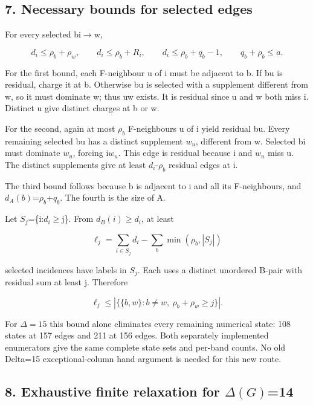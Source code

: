 \documentclass[
  11pt,
]{article}
\begin{document}
\hypertarget{necessary-bounds-for-selected-edges}{%
\subsection{7. Necessary bounds for selected
edges}\label{necessary-bounds-for-selected-edges}}

For every selected bi\ensuremath{\to}w,

\[
d_i\le \rho _b+\rho _w,\qquad d_i\le \rho _b+R_i,
\qquad d_i\le \rho _b+q_b-1,\qquad q_b+\rho _b\le a. \tag{7.1}
\]

For the first bound, each F-neighbour u of i must be adjacent to b. If
bu is residual, charge it at b. Otherwise bu is selected with a
supplement different from w, so it must dominate w; thus uw exists. It
is residual since u and w both miss i. Distinct u give distinct charges
at b or w.

For the second, again at most \ensuremath{\rho _b} F-neighbours u of i
yield residual bu. Every remaining selected bu has a distinct supplement
\ensuremath{w_u}, different from w. Selected bi must dominate
\ensuremath{w_u}, forcing i\ensuremath{w_u}. This edge is residual
because i and \ensuremath{w_u} miss u. The distinct supplements give at
least \ensuremath{d_i}-\ensuremath{\rho _b} residual edges at i.

The third bound follows because b is adjacent to i and all its
F-neighbours, and
\ensuremath{d_A(b)}=\ensuremath{\rho _b}+\ensuremath{q_b}. The fourth is
the size of A.

Let \ensuremath{S_j}=\{i:\ensuremath{d_i}\ensuremath{\ge}j\}. From
\ensuremath{d_B(i)}\ensuremath{\ge}\ensuremath{d_i}, at least

\[
\ell_j=\sum_{i\in S_j}d_i-\sum_b\min(\rho _b,|S_j|)
\]

selected incidences have labels in \ensuremath{S_j}. Each uses a
distinct unordered B-pair with residual sum at least j. Therefore

\[
\ell_j\le |\{\{b,w\}:b\ne w,\ \rho _b+\rho _w\ge j\}|. \tag{7.2}
\]

For \ensuremath{\Delta =15} this bound alone eliminates every remaining
numerical state: 108 states at 157 edges and 211 at 156 edges. Both
separately implemented enumerators give the same complete state sets and
per-band counts. No old Delta=15 exceptional-column hand argument is
needed for this new route.

\hypertarget{exhaustive-finite-relaxation-for-14}{%
\subsection{\texorpdfstring{8. Exhaustive finite relaxation for
\ensuremath{\Delta (G)}=14}{8. Exhaustive finite relaxation for =14}}\label{exhaustive-finite-relaxation-for-14}}
\end{document}
